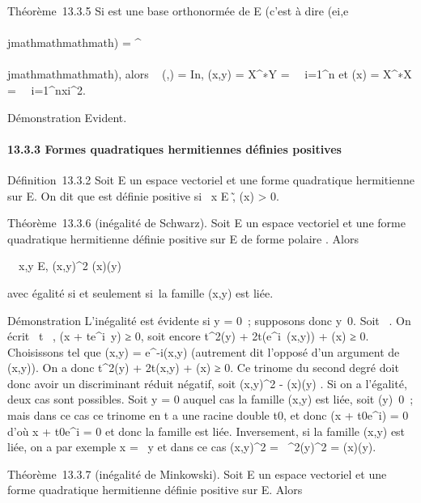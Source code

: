Théorème~13.3.5 Si  est une base orthonormée de E (c'est à dire
\phi(ei,e\\\\jmathmathmathmath) = \deltai^\\\\jmathmathmathmath), alors
\mathrmMat~ (\phi,) =
In, \phi(x,y) = X^∗Y =\
\sum ~
i=1^n\overlinexiyi
et \Phi(x) = X^∗X =\
\sum ~
i=1^n\textbar{}xi\textbar{}^2.

Démonstration Evident.

\paragraph{13.3.3 Formes quadratiques hermitiennes définies positives}

Définition~13.3.2 Soit E un \mathbb{C} espace vectoriel et \Phi une forme
quadratique hermitienne sur E. On dit que \Phi est définie positive si
\forall~x \in E \diagdown\0\~,
\Phi(x) \textgreater{} 0.

Théorème~13.3.6 (inégalité de Schwarz). Soit E un  espace vectoriel et
\Phi une forme quadratique hermitienne définie positive sur E de forme
polaire \phi. Alors

\forall~~x,y \in E,
\textbar{}\phi(x,y)\textbar{}^2 \leq \Phi(x)\Phi(y)

avec égalité si et seulement si~la famille (x,y) est liée.

Démonstration L'inégalité est évidente si y = 0~; supposons donc
y\neq~0. Soit \theta \in {}~. On écrit
\forall~t \in \mathbb{R}~, \Phi(x + te^i\theta~y) ≥ 0, soit
encore t^2\Phi(y) +
2t\mathrmRe(e^i\theta~\phi(x,y))
+ \Phi(x) ≥ 0. Choisissons \theta tel que \phi(x,y) =
e^-i\theta\textbar{}\phi(x,y)\textbar{} (autrement dit l'opposé d'un
argument de \phi(x,y)). On a donc t^2\Phi(y) +
2t\textbar{}\phi(x,y)\textbar{} + \Phi(x) ≥ 0. Ce trinome du second degré doit
donc avoir un discriminant réduit négatif, soit
\textbar{}\phi(x,y)\textbar{}^2 - \Phi(x)\Phi(y) \leq 0. Si on a
l'égalité, deux cas sont possibles. Soit y = 0 auquel cas la famille
(x,y) est liée, soit \Phi(y)\neq~0~; mais dans ce
cas ce trinome en t a une racine double t0, et donc \Phi(x +
t0e^i\thetay) = 0 d'où x + t0e^i\thetay
= 0 et donc la famille est liée. Inversement, si la famille (x,y) est
liée, on a par exemple x = \lambda~y et dans ce cas
\textbar{}\phi(x,y)\textbar{}^2 =
\textbar{}\lambda~^2\textbar{}\Phi(y)^2 = \Phi(x)\Phi(y).

Théorème~13.3.7 (inégalité de Minkowski). Soit E un  espace vectoriel
et \Phi une forme quadratique hermitienne définie positive sur E. Alors

